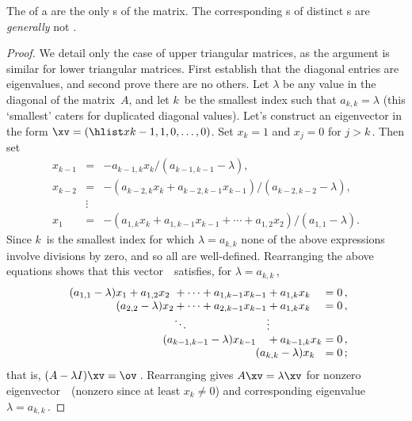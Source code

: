 \begin{theorem} \label{thm:trieig} 
The  of a  are the only s of the matrix.  
The corresponding s of distinct s are \emph{generally} not .
\end{theorem}

\begin{proof} 
We detail only the case of upper triangular matrices, as the argument is similar for lower triangular matrices. 
First establish that the diagonal entries are eigenvalues, and second prove there are no others.
Let \(\lambda\) be any value in the diagonal of the matrix~\(A\), and let \(k\)~be the smallest index such that \(a_{k,k}=\lambda\) (this `smallest' caters for duplicated diagonal values).
Let's construct an eigenvector in the form \(\xv=(\hlist x{k-1},1,0,\ldots,0)\).  
Set \(x_k=1\) and \(x_j=0\) for \(j>k\)\,.
Then set 
\begin{eqnarray*}
x_{k-1}&=&-a_{k-1,k}x_k/(a_{k-1,k-1}-\lambda),
\\x_{k-2}&=&-(a_{k-2,k}x_k+a_{k-2,k-1}x_{k-1})/(a_{k-2,k-2}-\lambda),
\\&\vdots&
\\x_1&=&-(a_{1,k}x_k+a_{1,k-1}x_{k-1}+\cdots+a_{1,2}x_2)/(a_{1,1}-\lambda).
\end{eqnarray*}
Since \(k\)~is the smallest index for which \(\lambda=a_{k,k}\) none of the above expressions involve divisions by zero, and so all are well-defined.
Rearranging the above equations shows that this vector~\xv\ satisfies, for  \(\lambda=a_{k,k}\)\,,
\begin{equation*}
\begin{array}{l@{}l@{}l@{}l@{}l@{}l}
(a_{1,1}-\lambda)x_1
&{}+a_{1,2}x_2
&{}+\cdots+a_{1,k-1}x_{k-1}
&{}+a_{1,k}x_k
&{}=0\,,
\\&\hspace{-1em}
(a_{2,2}-\lambda)x_2
&{}+\cdots+a_{2,k-1}x_{k-1}
&{}+a_{1,k}x_k
&{}=0\,,
\\&&\ddots&\vdots
\\&&\hspace{-1em}
(a_{k-1,k-1}-\lambda)x_{k-1}
&{}+a_{k-1,k}x_k
&{}=0\,,
\\&&&\hspace{-1em}
(a_{k,k}-\lambda)x_k
&{}=0\,;
\end{array}
\end{equation*}
that is, \((A-\lambda I)\xv=\ov\)\,.
Rearranging gives \(A\xv=\lambda\xv\) for nonzero eigenvector~\xv\ (nonzero since at least \(x_k\neq 0\)) and corresponding eigenvalue~\(\lambda=a_{k,k}\)\,.


\end{proof}
